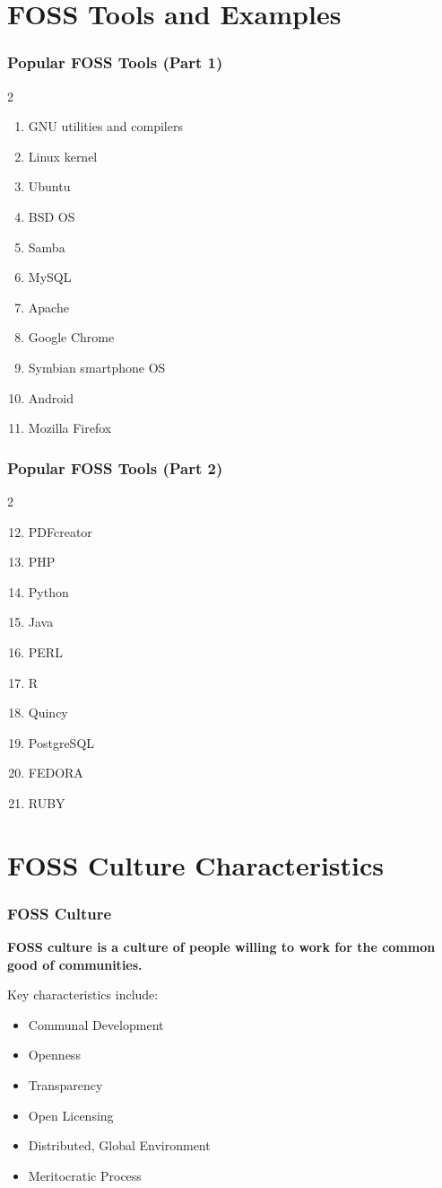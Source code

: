 \documentclass[aspectratio=169]{beamer}
\begin{document}
\section{FOSS Tools and Examples}

\begin{frame}
\frametitle{Popular FOSS Tools (Part 1)}
\begin{multicols}{2}
\begin{enumerate}
\item GNU utilities and compilers
\item Linux kernel
\item Ubuntu
\item BSD OS
\item Samba
\item MySQL
\item Apache
\item Google Chrome
\item Symbian smartphone OS
\item Android
\item Mozilla Firefox
\end{enumerate}
\end{multicols}
\end{frame}

\begin{frame}
\frametitle{Popular FOSS Tools (Part 2)}
\begin{multicols}{2}
\begin{enumerate}
\setcounter{enumi}{11}
\item PDFcreator
\item PHP
\item Python
\item Java
\item PERL
\item R
\item Quincy
\item PostgreSQL
\item FEDORA
\item RUBY
\end{enumerate}
\end{multicols}
\end{frame}

\section{FOSS Culture Characteristics}

\begin{frame}
\frametitle{FOSS Culture}
\textbf{FOSS culture is a culture of people willing to work for the common good of communities.}

Key characteristics include:
\begin{itemize}
\item Communal Development
\item Openness
\item Transparency
\item Open Licensing
\item Distributed, Global Environment
\item Meritocratic Process
\end{itemize}
\end{frame}
\end{document}
